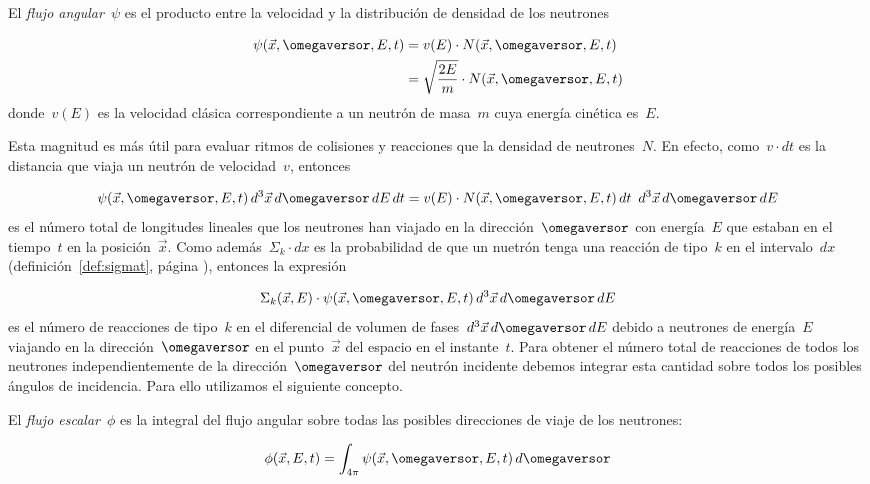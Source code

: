 \begin{definicion}
\label{def:flujoangular}
El \emph{flujo angular}~$\psi$ es el producto entre la velocidad y la distribución de densidad de los neutrones

\label{flujoangular}
\begin{align*}
 \psi(\vec{x}, \omegaversor, E, t) &= v(E) \cdot N(\vec{x}, \omegaversor, E, t)  \\
&= \sqrt{\frac{2E}{m}} \cdot N(\vec{x}, \omegaversor, E, t) 
\end{align*}
%
donde~$v(E)$ es la velocidad clásica correspondiente a un neutrón de masa~$m$ cuya energía cinética es~$E$.
\end{definicion}

Esta magnitud es más útil para evaluar ritmos de colisiones y reacciones que la densidad de neutrones~$N$. En efecto, como~$v \cdot dt$ es la distancia que viaja un neutrón de velocidad~$v$, entonces

\begin{equation*}
 \psi(\vec{x}, \omegaversor, E, t) \, d^3\vec{x} \, d\omegaversor \, dE \, dt = v(E) \cdot N(\vec{x}, \omegaversor, E, t) \, dt \,\,\, d^3\vec{x} \, d\omegaversor \, dE 
\end{equation*}
%
es el número total de longitudes lineales que los neutrones han viajado en la dirección~$\omegaversor$ con energía~$E$ que estaban en el tiempo~$t$ en la posición~$\vec{x}$. Como además~$\Sigma_k \cdot dx$ es la probabilidad de que un nuetrón tenga una reacción de tipo~$k$ en el intervalo~$dx$ (definición~\ref{def:sigmat}, página \pageref{def:sigmak}), entonces la expresión

\begin{equation*}
 \Sigma_k(\vec{x}, E) \cdot \psi(\vec{x}, \omegaversor, E, t) \, d^3\vec{x} \, d\omegaversor \, dE
\end{equation*}
%
es el número de reacciones de tipo~$k$ en el diferencial de volumen de fases~$d^3\vec{x} \, d\omegaversor \, dE$ debido a neutrones de energía~$E$ viajando en la dirección~$\omegaversor$ en el punto~$\vec{x}$ del espacio en el instante~$t$. Para obtener el número total de reacciones de todos los neutrones independientemente de la dirección~$\omegaversor$ del neutrón incidente debemos integrar esta cantidad sobre todos los posibles ángulos de incidencia. Para ello utilizamos el siguiente concepto.

\begin{definicion}
\label{def:flujoescalar}
El \emph{flujo escalar}~$\phi$ es la integral del flujo angular sobre todas las posibles direcciones de viaje de los neutrones:

\label{flujoescalar}
\begin{equation*}
\phi(\vec{x}, E, t) = \int_{4\pi} \psi(\vec{x}, \omegaversor, E, t) \, d\omegaversor
\end{equation*}
\end{definicion}

